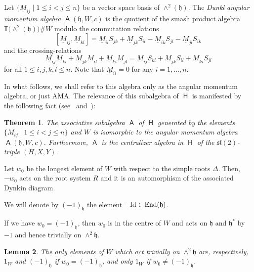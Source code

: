 \documentclass[10pt,a4paper]{amsart}
\numberwithin{equation}{section}
\newtheorem{Theorem}{Theorem}[section]
\newtheorem{Lemma}[Theorem]{Lemma}
\DeclareMathOperator{\End}{End}
\newcommand{\fh}{\mathfrak{h}}
\newcommand{\fl}{\mathfrak{l}}
\newcommand{\fs}{\mathfrak{s}}
\newcommand{\bbt}{\mathbb{T}}
\newcommand{\uM}{\underline{M}}
\DeclareMathOperator{\rca}{\mathsf{H}}
\DeclareMathOperator{\ama}{\mathsf{A}}
\begin{document}
\begin{Definition}[\cite{FH15}]\label{d:AMA}
Let $\{\uM_{ij}\mid 1\leq i<j\leq n\}$ be a vector space basis of $\wedge^2(\fh)$. The {\it Dunkl angular momentum algebra} $\ama(\fh,W,c)$ is the quotient of the smash product algebra $\bbt\big({\wedge}^2(\fh)\big)\#W$ modulo the commutation relations
\begin{equation}\label{e:agacomrel}
[\uM_{ij},\uM_{kl}] = \uM_{il}S_{jk} + \uM_{jk}S_{il}-\uM_{ik}S_{jl} - \uM_{jl}S_{ik}
\end{equation}
and the crossing-relations
\begin{equation}\label{e:agacrossrel}
\uM_{ij}\uM_{kl} + \uM_{jk}\uM_{il}+\uM_{ki}\uM_{jl} = \uM_{ij}S_{kl} + \uM_{jk}S_{il}+\uM_{ki}S_{jl}
\end{equation}
for all $1\leq i,j,k,l \leq n$.
Note that $\uM_{ii} = 0$ for any $i = 1,\dots, n$.
\end{Definition}

In what follows, we shall refer to this algebra only as the angular momentum algebra, or just AMA. The relevance of this subalgebra of $\rca$ is manifested by the following fact (see~\cite{FH15} and~\cite{CDM20}):

\begin{Theorem}\label{t:Centre}
The associative subalgebra $\ama$ of $\rca$ generated by the elements $\{M_{ij}\mid 1\leq i<j \leq n\}$ and $W$ is isomorphic to the angular momentum algebra $\ama(\fh,W,c)$. Furthermore, $\ama$ is the centralizer algebra in $\rca$ of the $\fs\fl(2)$-triple $(H,X,Y)$.
\end{Theorem}

Let $w_0$ be the longest element of $W$ with respect to the simple roots $\Delta$. Then, $-w_0$ acts on the root system $R$ and it is an automorphism of the associated Dynkin diagram.

\begin{Definition}
We will denote by $(-1)_\fh$ the element $-{\rm Id}\in\End(\fh)$.
\end{Definition}

\begin{Remark}
If we have $w_0=(-1)_\fh$, then $w_0$ is in the centre of $W$ and acts on $\mathfrak{h}$ and $\mathfrak{h}^*$
 by~$-1$ and hence trivially on $\wedge^2\mathfrak{h}$.
\end{Remark}

\begin{Lemma}\label{r:schurorth}
The only elements of $W$ which act trivially on $\wedge^2\mathfrak{h}$ are, respectively, $1_W$ and $(-1)_\fh$ if $w_0 = (-1)_\fh$, and only $1_W$ if $w_0\neq (-1)_\fh$.
\end{Lemma}
\end{document}
